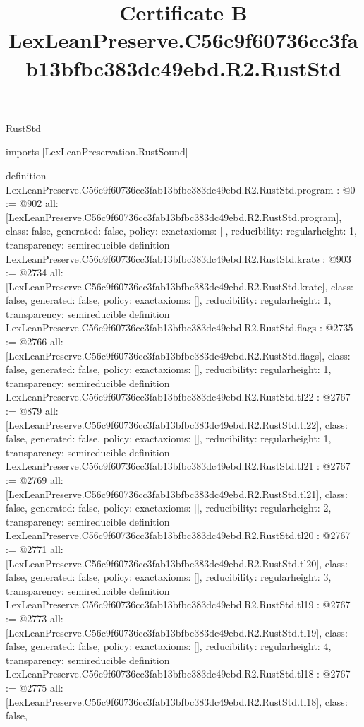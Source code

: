 \begin{lexlean}{RustStd}
\title{Certificate B LexLeanPreserve.C56c9f60736cc3fab13bfbc383dc49ebd.R2.RustStd}
\begin{coremodule}
imports [LexLeanPreservation.RustSound]

definition LexLeanPreserve.C56c9f60736cc3fab13bfbc383dc49ebd.R2.RustStd.program : @0 := @902 {
  all: [LexLeanPreserve.C56c9f60736cc3fab13bfbc383dc49ebd.R2.RustStd.program],
  class: false,
  generated: false,
  policy: exact{axioms: []},
  reducibility: regular{height: 1},
  transparency: semireducible
}
definition LexLeanPreserve.C56c9f60736cc3fab13bfbc383dc49ebd.R2.RustStd.krate : @903 := @2734 {
  all: [LexLeanPreserve.C56c9f60736cc3fab13bfbc383dc49ebd.R2.RustStd.krate],
  class: false,
  generated: false,
  policy: exact{axioms: []},
  reducibility: regular{height: 1},
  transparency: semireducible
}
definition LexLeanPreserve.C56c9f60736cc3fab13bfbc383dc49ebd.R2.RustStd.flags : @2735 := @2766 {
  all: [LexLeanPreserve.C56c9f60736cc3fab13bfbc383dc49ebd.R2.RustStd.flags],
  class: false,
  generated: false,
  policy: exact{axioms: []},
  reducibility: regular{height: 1},
  transparency: semireducible
}
definition LexLeanPreserve.C56c9f60736cc3fab13bfbc383dc49ebd.R2.RustStd.tl22 : @2767 := @879 {
  all: [LexLeanPreserve.C56c9f60736cc3fab13bfbc383dc49ebd.R2.RustStd.tl22],
  class: false,
  generated: false,
  policy: exact{axioms: []},
  reducibility: regular{height: 1},
  transparency: semireducible
}
definition LexLeanPreserve.C56c9f60736cc3fab13bfbc383dc49ebd.R2.RustStd.tl21 : @2767 := @2769 {
  all: [LexLeanPreserve.C56c9f60736cc3fab13bfbc383dc49ebd.R2.RustStd.tl21],
  class: false,
  generated: false,
  policy: exact{axioms: []},
  reducibility: regular{height: 2},
  transparency: semireducible
}
definition LexLeanPreserve.C56c9f60736cc3fab13bfbc383dc49ebd.R2.RustStd.tl20 : @2767 := @2771 {
  all: [LexLeanPreserve.C56c9f60736cc3fab13bfbc383dc49ebd.R2.RustStd.tl20],
  class: false,
  generated: false,
  policy: exact{axioms: []},
  reducibility: regular{height: 3},
  transparency: semireducible
}
definition LexLeanPreserve.C56c9f60736cc3fab13bfbc383dc49ebd.R2.RustStd.tl19 : @2767 := @2773 {
  all: [LexLeanPreserve.C56c9f60736cc3fab13bfbc383dc49ebd.R2.RustStd.tl19],
  class: false,
  generated: false,
  policy: exact{axioms: []},
  reducibility: regular{height: 4},
  transparency: semireducible
}
definition LexLeanPreserve.C56c9f60736cc3fab13bfbc383dc49ebd.R2.RustStd.tl18 : @2767 := @2775 {
  all: [LexLeanPreserve.C56c9f60736cc3fab13bfbc383dc49ebd.R2.RustStd.tl18],
  class: false,
}
\end{coremodule}
\end{lexlean}
